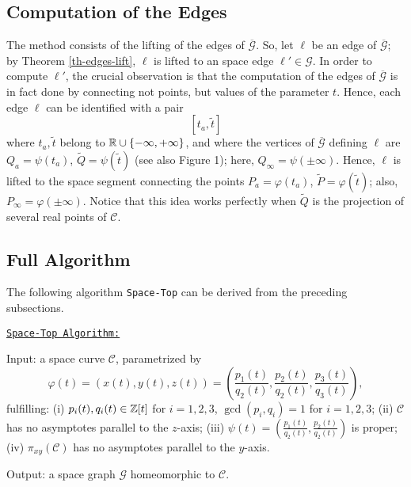 \documentclass{elsart}
\begin{document}
\subsection{Computation of the Edges}\label{edges-3d}

The method consists of the lifting of the edges of
$\overline{\mathcal G}$. So, let $\ell$ be an edge of
$\overline{\mathcal G}$; by Theorem \ref{th-edges-lift}, $\ell$ is
lifted to an space edge $\ell' \in {\mathcal G}$. In order to
compute $\ell'$, the crucial observation is that the computation
of the edges of $\overline{\mathcal G}$ is in fact done by
connecting not points, but values of the parameter $t$. Hence,
each edge $\ell$ can be identified with a pair \[ [t_a,\tilde{t}]
\]
where $t_a,\tilde{t}$ belong to ${\Bbb R}\cup
\{-\infty,+\infty\}$, and where the vertices of
$\overline{\mathcal G}$ defining $\ell$ are $Q_a=\psi(t_a)$,
$\tilde{Q}=\psi(\tilde{t})$ (see also Figure 1); here,
$Q_{\infty}=\psi(\pm \infty)$. Hence, $\ell$ is lifted to the
space segment connecting the points $P_a=\varphi(t_a)$,
$\tilde{P}=\varphi(\tilde{t})$; also, $P_{\infty}=\varphi(\pm
\infty)$. Notice that this idea works perfectly when $\tilde{Q}$
is the projection of several real points of ${\mathcal C}$.














\subsection{Full Algorithm}

The following algorithm {\tt Space-Top} can be derived from the preceding subsections.

\underline{\tt Space-Top Algorithm:}

{\sf Input:} a space curve ${\mathcal C}$, parametrized by \[\varphi(t)=(x(t),y(t),z(t))=\left(\displaystyle{\frac{p_1(t)}{q_2(t)}},\displaystyle{\frac{p_2(t)}{q_2(t)}},\displaystyle{\frac{p_3(t)}{q_3(t)}}\right),\]
fulfilling: (i) $p_i(t),q_i(t)\in {\Bbb Z}[t]$ for $i=1,2,3$, $\gcd(p_i,q_i)=1$ for $i=1,2,3$; (ii) ${\mathcal C}$ has no asymptotes parallel to the $z$-axis; (iii) $\psi(t)=\left(\displaystyle{\frac{p_1(t)}{q_2(t)}},\displaystyle{\frac{p_2(t)}{q_2(t)}}\right)$ is proper; (iv) $\pi_{xy}({\mathcal C})$ has no asymptotes parallel to the $y$-axis.

{\sf Output:}  a space graph ${\mathcal G}$ homeomorphic to ${\mathcal C}$.
\end{document}
